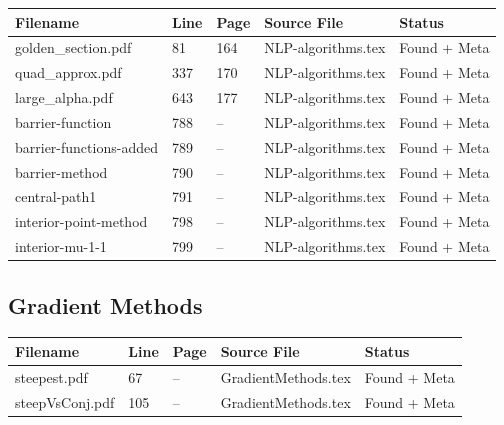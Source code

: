 \documentclass[11pt]{article}
\begin{document}
\begin{longtable}{|p{3.5cm}|p{1.5cm}|p{1cm}|p{4cm}|p{2cm}|}
\hline
\textbf{Filename} & \textbf{Line} & \textbf{Page} & \textbf{Source File} & \textbf{Status} \\
\hline
\endhead

golden\_section.pdf & 81 & 164 & NLP-algorithms.tex & \textcolor{found}{Found + Meta} \\
\hline

quad\_approx.pdf & 337 & 170 & NLP-algorithms.tex & \textcolor{found}{Found + Meta} \\
\hline

large\_alpha.pdf & 643 & 177 & NLP-algorithms.tex & \textcolor{found}{Found + Meta} \\
\hline

barrier-function & 788 & -- & NLP-algorithms.tex & \textcolor{found}{Found + Meta} \\
\hline

barrier-functions-added & 789 & -- & NLP-algorithms.tex & \textcolor{found}{Found + Meta} \\
\hline

barrier-method & 790 & -- & NLP-algorithms.tex & \textcolor{found}{Found + Meta} \\
\hline

central-path1 & 791 & -- & NLP-algorithms.tex & \textcolor{found}{Found + Meta} \\
\hline

interior-point-method & 798 & -- & NLP-algorithms.tex & \textcolor{found}{Found + Meta} \\
\hline

interior-mu-1-1 & 799 & -- & NLP-algorithms.tex & \textcolor{found}{Found + Meta} \\
\hline

\end{longtable}


\subsection{Gradient Methods}



\begin{longtable}{|p{3.5cm}|p{1.5cm}|p{1cm}|p{4cm}|p{2cm}|}
\hline
\textbf{Filename} & \textbf{Line} & \textbf{Page} & \textbf{Source File} & \textbf{Status} \\
\hline
\endhead

steepest.pdf & 67 & -- & GradientMethods.tex & \textcolor{found}{Found + Meta} \\
\hline

steepVsConj.pdf & 105 & -- & GradientMethods.tex & \textcolor{found}{Found + Meta} \\
\hline

\end{longtable}
\end{document}

